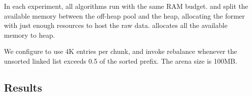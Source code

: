 In each experiment, all algorithms run with the same RAM budget. 
\oak\/ and \YoniList\/ split the available memory between the off-heap pool and the heap, 
allocating the former with just enough resources to host the raw data. \csl\/ allocates all the 
available memory to heap. 

We configure \oak\/ to use 4K entries per chunk, and invoke rebalance whenever the unsorted linked list
exceeds 0.5 of the sorted prefix. The  arena size is 100MB. 

\subsection{Results} 

